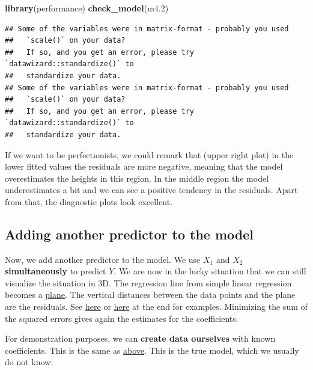 \documentclass[
]{book}
\newenvironment{Shaded}{\begin{snugshade}}{\end{snugshade}}
\newcommand{\FloatTok}[1]{\textcolor[rgb]{0.00,0.00,0.81}{#1}}
\newcommand{\FunctionTok}[1]{\textcolor[rgb]{0.13,0.29,0.53}{\textbf{#1}}}
\newcommand{\NormalTok}[1]{#1}
\begin{document}
\begin{Shaded}
\begin{Highlighting}[]
\FunctionTok{library}\NormalTok{(performance)}
\FunctionTok{check\_model}\NormalTok{(m4}\FloatTok{.2}\NormalTok{)}
\end{Highlighting}
\end{Shaded}

\begin{verbatim}
## Some of the variables were in matrix-format - probably you used
##   `scale()` on your data?
##   If so, and you get an error, please try `datawizard::standardize()` to
##   standardize your data.
## Some of the variables were in matrix-format - probably you used
##   `scale()` on your data?
##   If so, and you get an error, please try `datawizard::standardize()` to
##   standardize your data.
\end{verbatim}

If we want to be perfectionists, we could remark that (upper right plot)
in the lower fitted values the residuals are more negative,
meaning that the model overestimates the heights in this region.
In the middle region the model underestimates a bit and we can see
a positive tendency in the residuals. Apart from that,
the diagnostic plots look excellent.

\subsection{Adding another predictor to the model}\label{adding_predictor_freq}

Now, we add another predictor to the model. We use \(X_1\) and \(X_2\)
\textbf{simultaneously} to predict \(Y\). We are now in the lucky situation that
we can still visualize the situation in 3D. The regression line from simple
linear regression
becomes a \href{https://stackoverflow.com/questions/47344850/scatterplot3d-regression-plane-with-residuals}{plane}.
The vertical distances between the data points and the plane are the residuals.
See \href{https://rpubs.com/pjozefek/576206}{here} or
\href{https://www.sthda.com/english/wiki/scatterplot3d-3d-graphics-r-software-and-data-visualization}{here}
at the end for examples.
Minimizing the sum of the squared errors gives again
the estimates for the coefficients.

For demonstration purposes, we can \textbf{create data ourselves} with known
coefficients. This is the same as \hyperref[adding_predictor_bayes]{above}.
This is the true model, which we usually do not know:
\end{document}

